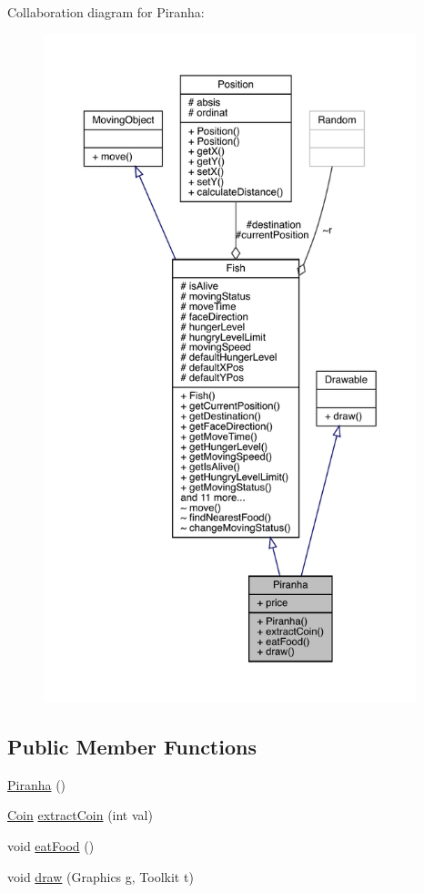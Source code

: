 Collaboration diagram for Piranha\+:
\nopagebreak
\begin{figure}[H]
\begin{center}
\leavevmode
\includegraphics[height=550pt]{class_piranha__coll__graph}
\end{center}
\end{figure}
\subsection*{Public Member Functions}
\begin{DoxyCompactItemize}
\item 
\mbox{\hyperlink{class_piranha_a162bfb763ec65582d2631cb44905b8b0}{Piranha}} ()
\item 
\mbox{\hyperlink{class_coin}{Coin}} \mbox{\hyperlink{class_piranha_a2cf10bd7477bf06d0f5020411acfe95d}{extract\+Coin}} (int val)
\item 
void \mbox{\hyperlink{class_piranha_a9310ca27aa9c8fdec55f03ef4fa994e0}{eat\+Food}} ()
\item 
void \mbox{\hyperlink{class_piranha_a8a06429a9c5b42fb4246f48c54d6cf78}{draw}} (Graphics g, Toolkit t)
\end{DoxyCompactItemize}
